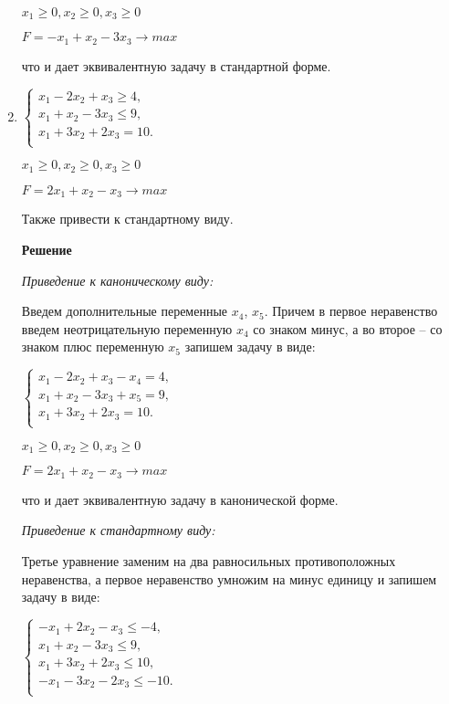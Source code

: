 \documentclass[12pt]{article}
\begin{document}
\begin{enumerate}
\begin{center}
$x_1\ge0, x_2\ge0, x_3\ge0$

$F=-x_1+x_2 -3x_3 \rightarrow max$
\end{center}
что и дает эквивалентную задачу в стандартной форме.
\newpage
\item
\begin{center}
$\begin{cases}
  x_1 -2x_2+x_3 \ge 4,\\ 
  x_1 +x_2 - 3x_3 \le9,\\
  x_1 +3x_2 +2x_3= 10.\\
\end{cases}$

$x_1\ge0, x_2\ge0, x_3\ge0$

$F=2x_1+x_2 -x_3 \rightarrow max$

Также привести к стандартному виду.
\end{center}

\textbf{Решение}

\textit{Приведение к каноническому виду:}

Введем дополнительные переменные $x_4$, $ x_5$. Причем в первое неравенство
введем неотрицательную переменную $x_4$ со знаком минус, а во второе – со
знаком плюс переменную $x_5$ запишем задачу в виде:
\begin{center}
$\begin{cases}
  x_1 -2x_2+x_3 -x_4 = 4,\\ 
  x_1 +x_2 - 3x_3 +x_5 =9,\\
  x_1 +3x_2 +2x_3= 10.\\
\end{cases}$

$x_1\ge0, x_2\ge0, x_3\ge0$

$F=2x_1+x_2 -x_3 \rightarrow max$
\end{center}
что и дает эквивалентную задачу в канонической форме.

\textit{Приведение к стандартному виду:}

Третье уравнение заменим на два равносильных противоположных неравенства, а первое неравенство умножим на минус единицу и запишем задачу в виде:
\begin{center}
$\begin{cases}
  -x_1 +2x_2-x_3 \le -4,\\ 
  x_1 +x_2 - 3x_3 \le9,\\
  x_1 +3x_2 +2x_3\le 10,\\
  -x_1 -3x_2 -2x_3\le -10.\\
\end{cases}$


\end{center}
\end{enumerate}
\end{document}
